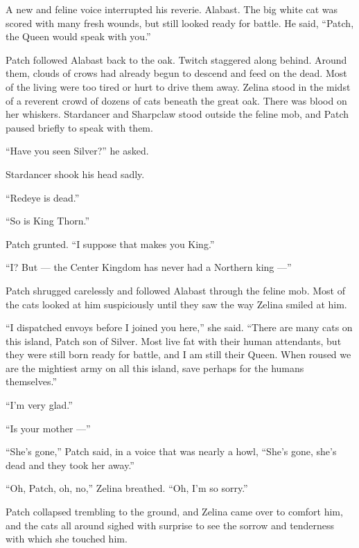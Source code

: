\documentclass[ebook,oneside,openany,17pt]{memoir}
\newenvironment{tolerant}[1]{%
  \par\tolerance=#1\relax
}{%
  \par
}
\begin{document}
A new and feline voice interrupted his reverie. Alabast. The big white
cat was scored with many fresh wounds, but still looked ready for
battle. He said, “Patch, the Queen would speak with you.”

\begin{tolerant}{1000}
Patch followed Alabast back to the oak. Twitch staggered along
behind. Around them, clouds of crows had already begun to descend and
feed on the dead. Most of the living were too tired or hurt to drive
them away. Zelina stood in the midst of a reverent crowd of dozens of
cats beneath the great oak. There was blood on her
whiskers. Stardancer and Sharpclaw stood outside the feline mob, and
Patch paused briefly to speak with them.
\end{tolerant}

“Have you seen Silver?” he asked.

Stardancer shook his head sadly.

“Redeye is dead.”

“So is King Thorn.”

Patch grunted. “I suppose that makes you King.”

“I? But — the Center Kingdom has never had a Northern king —”

\begin{tolerant}{1000}
Patch shrugged carelessly and followed Alabast through the feline
mob. Most of the cats looked at him suspiciously until they saw the
way Zelina smiled at him.
\end{tolerant}

“I dispatched envoys before I joined you here,” she said. “There are
many cats on this island, Patch son of Silver. Most live fat with
their human attendants, but they were still born ready for battle, and
I am still their Queen. When roused we are the mightiest army on all
this island, save perhaps for the humans themselves.”

“I’m very glad.”

“Is your mother —”

“She’s gone,” Patch said, in a voice that was nearly a howl, “She’s
gone, she’s dead and they took her away.”

“Oh, Patch, oh, no,” Zelina breathed. “Oh, I’m so sorry.”

\begin{tolerant}{500}
Patch collapsed trembling to the ground, and Zelina came over to
comfort him, and the cats all around sighed with surprise to see the
sorrow and tenderness with which she touched him.
\end{tolerant}
\end{document}
